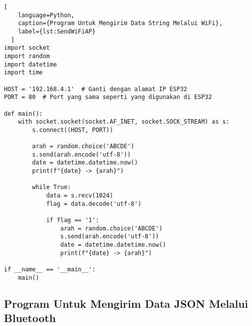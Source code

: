 \begin{lstlisting}[
    language=Python,
    caption={Program Untuk Mengirim Data String Melalui WiFi},
    label={lst:SendWiFiAP}
  ]
import socket
import random
import datetime
import time

HOST = '192.168.4.1'  # Ganti dengan alamat IP ESP32
PORT = 80  # Port yang sama seperti yang digunakan di ESP32

def main():
    with socket.socket(socket.AF_INET, socket.SOCK_STREAM) as s:
        s.connect((HOST, PORT))
        
        arah = random.choice('ABCDE')
        s.send(arah.encode('utf-8'))
        date = datetime.datetime.now()
        print(f"{date} -> {arah}")
        
        while True:
            data = s.recv(1024)
            flag = data.decode('utf-8')
            
            if flag == '1':
                arah = random.choice('ABCDE')
                s.send(arah.encode('utf-8'))
                date = datetime.datetime.now()
                print(f"{date} -> {arah}")

if __name__ == '__main__':
    main()
\end{lstlisting}

\subsection*{Program Untuk Mengirim Data JSON Melalui Bluetooth}

